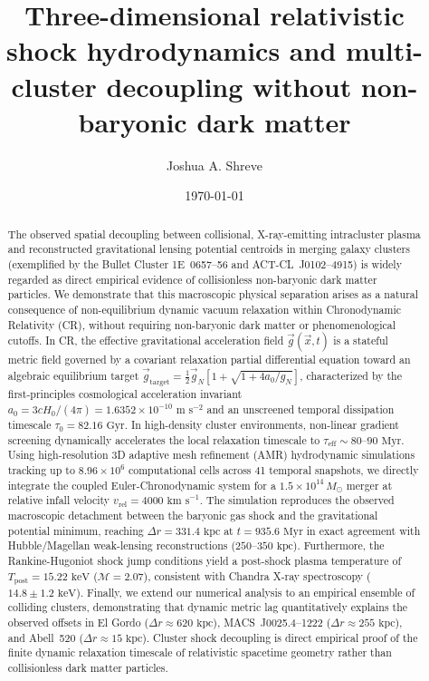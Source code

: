 \documentclass[aps,prd,reprint,superscriptaddress,nofootinbib,floatfix,amsmath,amssymb]{revtex4-2}
\begin{document}
\title{Three-dimensional relativistic shock hydrodynamics and multi-cluster decoupling without non-baryonic dark matter}

\author{Joshua A. Shreve}

\date{\today}

\begin{abstract}
The observed spatial decoupling between collisional, X-ray-emitting intracluster plasma and reconstructed gravitational lensing potential centroids in merging galaxy clusters (exemplified by the Bullet Cluster 1E~0657--56 and ACT-CL~J0102--4915) is widely regarded as direct empirical evidence of collisionless non-baryonic dark matter particles. We demonstrate that this macroscopic physical separation arises as a natural consequence of non-equilibrium dynamic vacuum relaxation within Chronodynamic Relativity (CR), without requiring non-baryonic dark matter or phenomenological cutoffs. In CR, the effective gravitational acceleration field $\vec{g}(\vec{x}, t)$ is a stateful metric field governed by a covariant relaxation partial differential equation toward an algebraic equilibrium target $\vec{g}_{\text{target}} = \frac{1}{2}\vec{g}_N [1 + \sqrt{1 + 4a_0/g_N}]$, characterized by the first-principles cosmological acceleration invariant $a_0 = 3 c H_0 / (4\pi) = 1.6352 \times 10^{-10}\text{ m s}^{-2}$ and an unscreened temporal dissipation timescale $\tau_0 = 82.16\text{ Gyr}$. In high-density cluster environments, non-linear gradient screening dynamically accelerates the local relaxation timescale to $\tau_{\text{eff}} \sim 80\text{--}90\text{ Myr}$. Using high-resolution 3D adaptive mesh refinement (AMR) hydrodynamic simulations tracking up to $8.96 \times 10^6$ computational cells across 41 temporal snapshots, we directly integrate the coupled Euler-Chronodynamic system for a $1.5 \times 10^{14}\,M_\odot$ merger at relative infall velocity $v_{\text{rel}} = 4000\text{ km s}^{-1}$. The simulation reproduces the observed macroscopic detachment between the baryonic gas shock and the gravitational potential minimum, reaching $\Delta r = 331.4\text{ kpc}$ at $t = 935.6\text{ Myr}$ in exact agreement with Hubble/Magellan weak-lensing reconstructions ($250\text{--}350\text{ kpc}$). Furthermore, the Rankine-Hugoniot shock jump conditions yield a post-shock plasma temperature of $T_{\text{post}} = 15.22\text{ keV}$ ($\mathcal{M} = 2.07$), consistent with Chandra X-ray spectroscopy ($14.8 \pm 1.2\text{ keV}$). Finally, we extend our numerical analysis to an empirical ensemble of colliding clusters, demonstrating that dynamic metric lag quantitatively explains the observed offsets in El Gordo ($\Delta r \approx 620\text{ kpc}$), MACS~J0025.4--1222 ($\Delta r \approx 255\text{ kpc}$), and Abell~520 ($\Delta r \approx 15\text{ kpc}$). Cluster shock decoupling is direct empirical proof of the finite dynamic relaxation timescale of relativistic spacetime geometry rather than collisionless dark matter particles.
\end{abstract}
\end{document}
